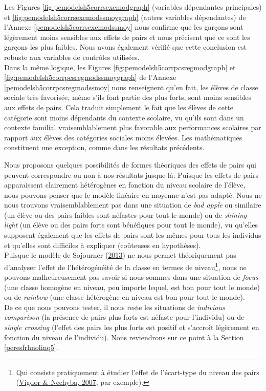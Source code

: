 \documentclass[
]{book}
\begin{document}
Les Figures \ref{fig:pemodelsh5corrsexemodgraph} (variables dépendantes principales) et \ref{fig:pemodelsh5corrsexemodssmoygraph} (autres variables dépendantes) de l'Annexe \ref{pemodelsh5corrsexemodssmoy} nous confirme que les garçons sont légèrement moins sensibles aux effets de pairs et nous précisent que ce sont les garçons les plus faibles. Nous avons également vérifié que cette conclusion est robuste aux variables de contrôles utilisées.\\
Dans la même logique, les Figures \ref{fig:pemodelsh5corrpcsregmodgraph} et \ref{fig:pemodelsh5corrpcsregmodssmoygraph} de l'Annexe \ref{pemodelsh5corrpcsregmodssmoy} nous renseignent qu'en fait, les élèves de classe sociale très favorisée, même s'ils font partie des plus forts, sont moins sensibles aux effets de pairs. Cela traduit simplement le fait que les élèves de cette catégorie sont moins dépendants du contexte scolaire, vu qu'ils sont dans un contexte familial vraisemblablement plus favorable aux performances scolaires par rapport aux élèves des catégories sociales moins élevées. Les mathématiques constituent une exception, comme dans les résultats précédents.

\quad Nous proposons quelques possibilités de formes théoriques des effets de pairs qui peuvent correspondre ou non à nos résultats jusque-là. Puisque les effets de pairs apparaissent clairement hétérogènes en fonction du niveau scolaire de l'élève, nous pouvons penser que le modèle linéaire en moyenne n'est pas adapté. Nous ne nous trouvons vraisemblablement pas dans une situation de \emph{bad apple} ou similaire (un élève ou des pairs faibles sont néfastes pour tout le monde) ou de \emph{shining light} (un élève ou des pairs forts sont bénéfiques pour tout le monde), vu qu'elles supposent également que les effets de pairs sont les mêmes pour tous les individus et qu'elles sont difficiles à expliquer (coûteuses en hypothèses).\\
Puisque le modèle de Sojourner (\protect\hyperlink{ref-SOJ:13}{2013}) ne nous permet théoriquement pas d'analyser l'effet de l'hétérogénéité de la classe en termes de niveau\footnote{Qui consiste pratiquement à étudier l'effet de l'écart-type du niveau des pairs (\protect\hyperlink{ref-VID:NEC:06}{Vigdor \& Nechyba, 2007}, par exemple).}, nous ne pouvons malheureusement pas savoir si nous sommes dans une situation de \emph{focus} (une classe homogène en niveau, peu importe lequel, est bon pour tout le monde) ou de \emph{rainbow} (une classe hétérogène en niveau est bon pour tout le monde).\\
De ce que nous pouvons tester, il nous reste les situations de \emph{indivious comparison} (la présence de pairs plus forts est néfaste pour l'individu) ou de \emph{single crossing} (l'effet des pairs les plus forts est positif et s'accroît légèrement en fonction du niveau de l'individu). Nous reviendrons sur ce point à la Section \ref{peresfrhnolinq5}.
\end{document}
